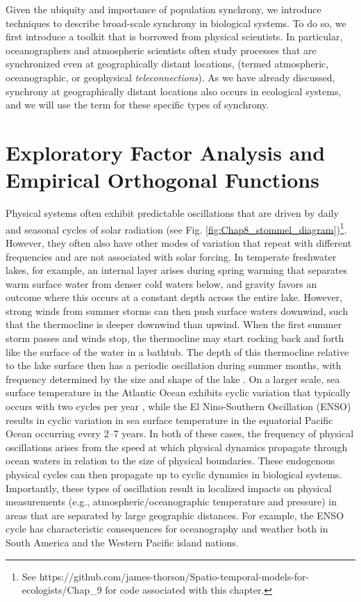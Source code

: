 Given the ubiquity and importance of population synchrony, we introduce techniques to describe broad-scale synchrony in biological systems.  To do so, we first introduce a toolkit that is borrowed from physical scientists.  In particular, oceanographers and atmospheric scientists often study processes that are synchronized even at geographically distant locations, (termed atmospheric, oceanographic, or geophysical \textit{teleconnections}).  As we have already discussed, synchrony at geographically distant locations also occurs in ecological systems, and we will use the term  for these specific types of synchrony.   

\section{Exploratory Factor Analysis and Empirical Orthogonal Functions} \label{sec:Chap9_EOF}

Physical systems often exhibit predictable oscillations that are driven by daily and seasonal cycles of solar radiation (see Fig. \ref{fig:Chap8_stommel_diagram})\footnote{See https://github.com/james-thorson/Spatio-temporal-models-for-ecologists/Chap\_9 for code associated with this chapter.}.  However, they often also have other modes of variation that repeat with different frequencies and are not associated with solar forcing.  In temperate freshwater lakes, for example, an internal layer arises during spring warming that separates warm surface water from denser cold waters below, and gravity favors an outcome where this  occurs at a constant depth across the entire lake.  However, strong winds from summer storms can then push surface waters downwind, such that the thermocline is deeper downwind than upwind.  When the first summer storm passes and winds stop, the thermocline may start rocking back and forth like the surface of the water in a bathtub.  The depth of this thermocline relative to the lake surface then has a periodic oscillation during summer months, with frequency determined by the size and shape of the lake \cite{stevens_estimation_1997}.  On a larger scale, sea surface temperature in the Atlantic Ocean exhibits cyclic variation that typically occurs with two cycles per year \cite{brandt_annual_2016}, while the El Nino-Southern Oscillation (ENSO) results in cyclic variation in sea surface temperature in the equatorial Pacific Ocean occurring every 2--7 years.  In both of these cases, the frequency of physical oscillations arises from the speed at which physical dynamics propagate through ocean waters in relation to the size of physical boundaries.  These endogenous physical cycles can then propagate up to cyclic dynamics in biological systems.  Importantly, these types of oscillation result in localized impacts on physical measurements (e.g., atmospheric/oceanographic temperature and pressure) in areas that are separated by large geographic distances.  For example, the ENSO cycle has characteristic consequences for oceanography and weather both in South America and the Western Pacific island nations.   

